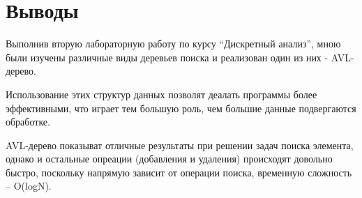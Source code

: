 \section{Выводы}

Выполнив вторую лабораторную работу по курсу \enquote{Дискретный анализ}, мною были изучены различные виды деревьев поиска и реализован один из них - AVL-дерево.\newline

Использование этих структур данных позволят деалать программы более эффективными, что играет тем большую роль, чем большие данные подвергаются обработке.\newline

AVL-дерево показыват отличные результаты при решении задач поиска элемента, однако и остальные опреации (добавления и удаления) происходят довольно быстро, поскольку напрямую зависит от операции поиска, временную сложность – O(logN).\newline

\pagebreak
